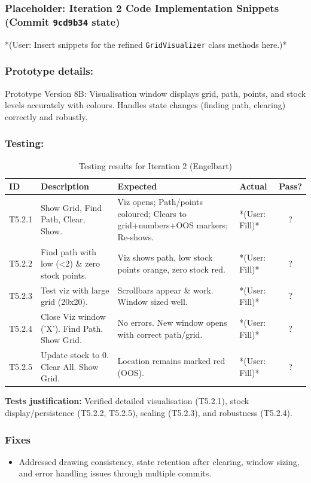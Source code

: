 \newpage
\subsubsection*{Placeholder: Iteration 2 Code Implementation Snippets (Commit \verb|9cd9b34| state)}
*(User: Insert snippets for the refined \verb|GridVisualizer| class methods here.)*
\newpage

\subsubsection{Prototype details:}
Prototype Version 8B: Visualisation window displays grid, path, points, and stock levels accurately with colours. Handles state changes (finding path, clearing) correctly and robustly.

\subsubsection{Testing:}
\begin{table}[htbp]
	\centering
	\begin{tabularx}{\textwidth}{|l|X|p{4.5cm}|p{1.5cm}|c|}
		\hline
		\textbf{ID} & \textbf{Description} & \textbf{Expected} & \textbf{Actual} & \textbf{Pass?} \\
		\hline
		T5.2.1 & Show Grid, Find Path, Clear, Show. & Viz opens; Path/points coloured; Clears to grid+numbers+OOS markers; Re-shows. & *(User: Fill)* & ? \\
		\hline
		T5.2.2 & Find path with low (<2) \& zero stock points. & Viz shows path, low stock points orange, zero stock red. & *(User: Fill)* & ? \\
		\hline
		T5.2.3 & Test viz with large grid (20x20). & Scrollbars appear \& work. Window sized well. & *(User: Fill)* & ? \\
		\hline
		T5.2.4 & Close Viz window ('X'). Find Path. Show Grid. & No errors. New window opens with correct path/grid. & *(User: Fill)* & ? \\
		\hline
		T5.2.5 & Update stock to 0. Clear All. Show Grid. & Location remains marked red (OOS). & *(User: Fill)* & ? \\
		\hline
	\end{tabularx}
	\caption{Testing results for Iteration 2 (Engelbart)}
\end{table}
\textbf{Tests justification:} Verified detailed visualisation (T5.2.1), stock display/persistence (T5.2.2, T5.2.5), scaling (T5.2.3), and robustness (T5.2.4).

\subsubsection{Fixes}
\begin{itemize}
	\item Addressed drawing consistency, state retention after clearing, window sizing, and error handling issues through multiple commits.
\end{itemize}

